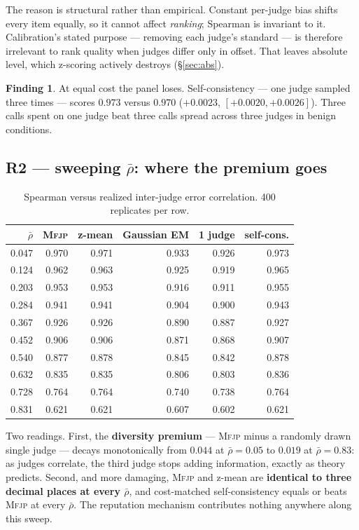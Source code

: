 \documentclass[11pt]{article}
\theoremstyle{definition}
\newtheorem{finding}{Finding}
\newcommand{\rhobar}{\ensuremath{\bar{\rho}}}
\newcommand{\mfjp}{\textsc{Mfjp}}
\begin{document}
The reason is structural rather than empirical. Constant per-judge bias shifts every item
equally, so it cannot affect \emph{ranking}; Spearman is invariant to it. Calibration's stated
purpose --- removing each judge's standard --- is therefore irrelevant to rank quality when
judges differ only in offset. That leaves absolute level, which z-scoring actively destroys
(\S\ref{sec:abs}).

\begin{finding}
At equal cost the panel loses. Self-consistency --- one judge sampled three times --- scores
$0.973$ versus $0.970$ ($+0.0023$, $[+0.0020,+0.0026]$). Three calls spent on one judge beat
three calls spread across three judges in benign conditions.
\end{finding}

\subsection{R2 --- sweeping \rhobar{}: where the premium goes}

\begin{table}[H]\centering
\begin{tabular}{rrrrrr}
\toprule
\rhobar{} & \mfjp{} & z-mean & Gaussian EM & 1 judge & self-cons. \\
\midrule
0.047 & 0.970 & 0.971 & 0.933 & 0.926 & 0.973 \\
0.124 & 0.962 & 0.963 & 0.925 & 0.919 & 0.965 \\
0.203 & 0.953 & 0.953 & 0.916 & 0.911 & 0.955 \\
0.284 & 0.941 & 0.941 & 0.904 & 0.900 & 0.943 \\
0.367 & 0.926 & 0.926 & 0.890 & 0.887 & 0.927 \\
0.452 & 0.906 & 0.906 & 0.871 & 0.868 & 0.907 \\
0.540 & 0.877 & 0.878 & 0.845 & 0.842 & 0.878 \\
0.632 & 0.835 & 0.835 & 0.806 & 0.803 & 0.836 \\
0.728 & 0.764 & 0.764 & 0.740 & 0.738 & 0.764 \\
0.831 & 0.621 & 0.621 & 0.607 & 0.602 & 0.621 \\
\bottomrule
\end{tabular}
\caption{Spearman versus realized inter-judge error correlation. 400 replicates per row.}
\end{table}

Two readings. First, the \textbf{diversity premium} --- \mfjp{} minus a randomly drawn single
judge --- decays monotonically from $0.044$ at $\rhobar=0.05$ to $0.019$ at $\rhobar=0.83$: as
judges correlate, the third judge stops adding information, exactly as theory predicts.
Second, and more damaging, \mfjp{} and z-mean are \textbf{identical to three decimal places at
every \rhobar{}}, and cost-matched self-consistency equals or beats \mfjp{} at every
\rhobar{}. The reputation mechanism contributes nothing anywhere along this sweep.
\end{document}
